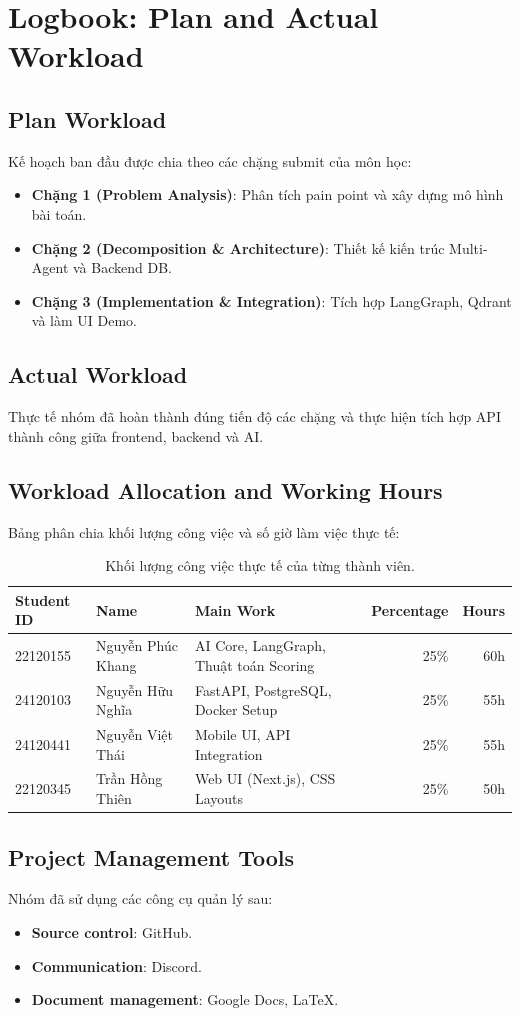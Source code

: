 \section{Logbook: Plan and Actual Workload}

\subsection{Plan Workload}

Kế hoạch ban đầu được chia theo các chặng submit của môn học:
\begin{itemize}
    \item \textbf{Chặng 1 (Problem Analysis)}: Phân tích pain point và xây dựng mô hình bài toán.
    \item \textbf{Chặng 2 (Decomposition \& Architecture)}: Thiết kế kiến trúc Multi-Agent và Backend DB.
    \item \textbf{Chặng 3 (Implementation \& Integration)}: Tích hợp LangGraph, Qdrant và làm UI Demo.
\end{itemize}

\subsection{Actual Workload}

Thực tế nhóm đã hoàn thành đúng tiến độ các chặng và thực hiện tích hợp API thành công giữa frontend, backend và AI.

\subsection{Workload Allocation and Working Hours}

Bảng phân chia khối lượng công việc và số giờ làm việc thực tế:
\begin{table}[H]
\centering
\begin{tabularx}{\textwidth}{l l X r r}
\toprule
\textbf{Student ID} & \textbf{Name} & \textbf{Main Work} & \textbf{Percentage} & \textbf{Hours} \\
\midrule
22120155 & Nguyễn Phúc Khang & AI Core, LangGraph, Thuật toán Scoring & 25\% & 60h \\
24120103 & Nguyễn Hữu Nghĩa & FastAPI, PostgreSQL, Docker Setup & 25\% & 55h \\
24120441 & Nguyễn Việt Thái & Mobile UI, API Integration & 25\% & 55h \\
22120345 & Trần Hồng Thiên & Web UI (Next.js), CSS Layouts & 25\% & 50h \\
\bottomrule
\end{tabularx}
\caption{Khối lượng công việc thực tế của từng thành viên.}
\end{table}

\subsection{Project Management Tools}

Nhóm đã sử dụng các công cụ quản lý sau:
\begin{itemize}
    \item \textbf{Source control}: GitHub.
    \item \textbf{Communication}: Discord.
    \item \textbf{Document management}: Google Docs, LaTeX.
\end{itemize}
